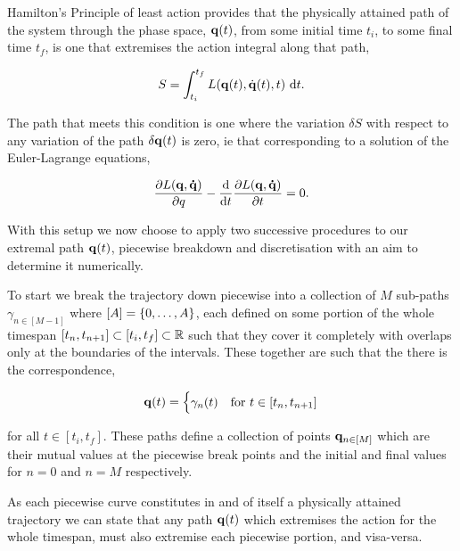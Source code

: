 \documentclass[10pt]{iopart}
\begin{document}
Hamilton's Principle of least action \cite{goldsteinClassicalMechanics2000} provides that the physically attained path of the system through the phase space, $\vb q(t)$, from some initial time $t_i$, to some final time $t_f$, is one that extremises the action integral along that path,

\begin{equation}
\label{eq:action-integral}
	S = \int_{t_i}^{t_f} L(\vb{q}(t), \dot{\vb{q}}(t), t) ~\mathrm{d} t.
\end{equation}

The path that meets this condition is one where the variation $\delta S$ with respect to any variation of the path $\delta \vb q(t)$ is zero, ie that corresponding to a solution of the Euler-Lagrange equations,

\begin{equation}
	\label{eq:euler-lagrange}
	\frac{\partial L(\vb q, \vb{\dot q})}{\partial q} - \frac{\dd}{\dd t}\frac{\partial L(\vb q, \vb{\dot q})}{\partial t} = 0.
\end{equation}


With this setup we now choose to apply two successive procedures to our extremal path $\vb q(t)$, piecewise breakdown and discretisation with an aim to determine it numerically.

To start we break the trajectory down piecewise into a collection of $M$ sub-paths $\gamma_{n \in [M - 1]}$ where $[A] = \left\{0, \dots, A\right\}$, each defined on some portion of the whole timespan $[t_n, t_{n + 1}] \subset [t_i, t_f] \subset \mathbb{R}$ such that they cover it completely with overlaps only at the boundaries of the intervals. These together are such that the there is the correspondence,

\begin{equation}
\label{eq:pw-traj}
	\vb q(t) = \begin{cases}
		\gamma_n(t) &\text{for~} t \in [t_n, t_{n + 1}]
	\end{cases}
\end{equation}

for all $t \in [t_i, t_f]$. These paths define a collection of points $\vb q_{n \in [M]}$ which are their mutual values at the piecewise break points and the initial and final values for $n = 0$ and $n = M$ respectively.

As each piecewise curve constitutes in and of itself a physically attained trajectory we can state that any path $\vb{q}(t)$ which extremises the action for the whole timespan, must also extremise each piecewise portion, and visa-versa. 
\end{document}

